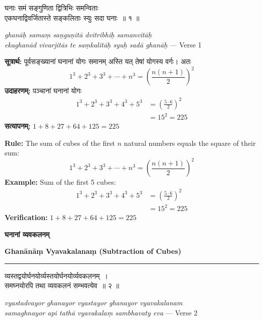\documentclass[11pt,a4paper]{article}
\newcommand{\dev}[1]{{\devanagarifont #1}}
\newcommand{\bicol}[2]{%
\noindent%
\begin{minipage}[t]{0.48\textwidth}
\begin{flushleft}
\small
#1
\end{flushleft}
\end{minipage}%
\hfill%
\begin{minipage}[t]{0.48\textwidth}
\begin{flushleft}
\small
#2
\end{flushleft}
\end{minipage}%
\vspace{0.4em}
}
\newcommand{\bicolverse}[2]{%
\par\noindent%
\begin{minipage}[t]{0.48\textwidth}
\centering
\color{versecolor}
\devanagarifont
\small
#1
\end{minipage}%
\hfill%
\begin{minipage}[t]{0.48\textwidth}
\centering
\color{versecolor}
\small
#2
\end{minipage}%
\par\vspace{0.4em}
}
\newcommand{\sectionbicol}[2]{%
\vspace{0.5em}
\noindent%
\begin{minipage}[t]{0.48\textwidth}
\begin{center}
\large\bfseries\color{sectioncolor}
\dev{#1}
\end{center}
\end{minipage}%
\hfill%
\begin{minipage}[t]{0.48\textwidth}
\begin{center}
\large\bfseries\color{sectioncolor}
#2
\end{center}
\end{minipage}%
\vspace{0.3em}
\noindent\rule{\textwidth}{0.4pt}
}
\begin{document}
\vspace{0.3cm}

\bicolverse{%
घनाः समं सङ्गुणिता द्वित्रिभिः समन्विताः\\
एकघनाद्विवर्जितास्ते सङ्कलिताः स्युः सदा घनाः~॥ १ ॥
}{%
\textit{ghan\={a}\d{h} sama\d{m} sa\d{n}gu\d{n}it\={a} dvitribhi\d{h} samanvit\={a}\d{h}}\\
\textit{ekaghan\={a}d vivarjit\={a}s te sa\d{m}kalit\={a}\d{h} syu\d{h} sad\={a} ghan\={a}\d{h}} --- Verse 1
}

\vspace{0.5cm}

\bicol{%
\textbf{सूत्रार्थ:} पूर्वसङ्ख्यानां घनानां योगः समानम् अस्ति यत् तेषां योगस्य वर्गः। अतः
\[1^3 + 2^3 + 3^3 + \cdots + n^3 = \left(\frac{n(n+1)}{2}\right)^2\]
\textbf{उदाहरणम्:} पञ्चानां घनानां योगः
\begin{align*}
1^3 + 2^3 + 3^3 + 4^3 + 5^3 &= \left(\frac{5 \cdot 6}{2}\right)^2 \\
&= 15^2 = 225
\end{align*}
\textbf{सत्यापनम्:} $1 + 8 + 27 + 64 + 125 = 225$
}{%
\textbf{Rule:} The sum of cubes of the first $n$ natural numbers equals the square of their sum:
\[1^3 + 2^3 + 3^3 + \cdots + n^3 = \left(\frac{n(n+1)}{2}\right)^2\]
\textbf{Example:} Sum of the first 5 cubes:
\begin{align*}
1^3 + 2^3 + 3^3 + 4^3 + 5^3 &= \left(\frac{5 \cdot 6}{2}\right)^2 \\
&= 15^2 = 225
\end{align*}
\textbf{Verification:} $1 + 8 + 27 + 64 + 125 = 225$ \checkmark
}

\clearpage

\sectionbicol{घनानां व्यवकलनम्}{Ghan\={a}n\={a}\d{m} Vyavakalana\d{m} (Subtraction of Cubes)}

\vspace{0.3cm}

\bicolverse{%
व्यस्तद्वयोर्घनयोर्व्यस्तयोर्घनयोर्व्यवकलनम्~।\\
समघ्नयोरपि तथा व्यवकलनं सम्भवत्येव~॥ २ ॥
}{%
\textit{vyastadvayor ghanayor vyastayor ghanayor vyavakalanam}\\
\textit{samaghnayor api tath\={a} vyavakala\d{m} sambhavaty eva} --- Verse 2
}

\vspace{0.5cm}
\end{document}
